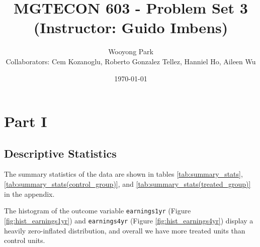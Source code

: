 \documentclass[11pt]{article}
\title{MGTECON 603 - Problem Set 3\\ \small{(Instructor: Guido Imbens)}}
\author{Wooyong Park\\ {\small Collaborators: Cem Kozanoglu, Roberto Gonzalez Tellez, Hanniel Ho, Aileen Wu}}
\date{\today}
\numberwithin{equation}{section}
\begin{document}
\maketitle

\section{Part I}

\subsection*{Descriptive Statistics}

The summary statistics of the data are shown in tables \ref{tab:summary_stats}, \ref{tab:summary_stats(control_group)}, and \ref{tab:summary_stats(treated_group)} in the appendix.

The histogram of the outcome variable \verb|earnings1yr| (Figure \ref{fig:hist_earnings1yr}) and \verb|earnings4yr| (Figure \ref{fig:hist_earnings4yr}) display a heavily zero-inflated distribution, and overall we have more treated units than control units.
\end{document}
